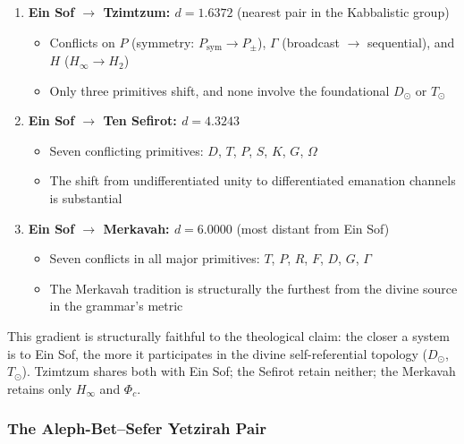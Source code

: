 \documentclass[12pt,a4paper]{article}
\begin{document}
\begin{enumerate}
    \item 
    \textbf{Ein Sof $\rightarrow$ Tzimtzum: $d = 1.6372$} (nearest pair in the Kabbalistic group)

    \begin{itemize}
    \item Conflicts on $P$ (symmetry: $P_\text{sym} \to P_{\pm}$), $\Gamma$ (broadcast $\rightarrow$ sequential), and $H$ ($H_{\infty} \to H_2$)
    \item Only three primitives shift, and none involve the foundational $D_{\odot}$ or $T_{\odot}$
\end{itemize}

    \item 
    \textbf{Ein Sof $\rightarrow$ Ten Sefirot: $d = 4.3243$}

    \begin{itemize}
    \item Seven conflicting primitives: $D$, $T$, $P$, $S$, $K$, $G$, $\Omega$
    \item The shift from undifferentiated unity to differentiated emanation channels is substantial
\end{itemize}

    \item 
    \textbf{Ein Sof $\rightarrow$ Merkavah: $d = 6.0000$} (most distant from Ein Sof)

    \begin{itemize}
    \item Seven conflicts in all major primitives: $T$, $P$, $R$, $F$, $D$, $G$, $\Gamma$
    \item The Merkavah tradition is structurally the furthest from the divine source in the grammar's metric
\end{itemize}

\end{enumerate}

This gradient is structurally faithful to the theological claim: the closer a system is to Ein Sof, the more it participates in the divine self-referential topology ($D_{\odot}$, $T_{\odot}$). Tzimtzum shares both with Ein Sof; the Sefirot retain neither; the Merkavah retains only $H_{\infty}$ and $\Phi_c$.

\subsubsection{The Aleph-Bet--Sefer Yetzirah Pair}
\end{document}
